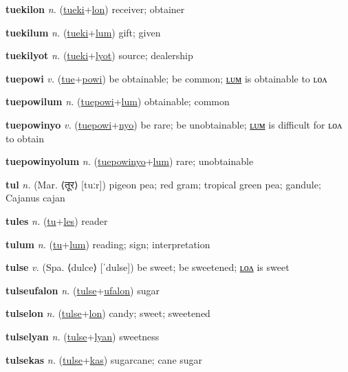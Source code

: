 \textbf{\hypertarget{tuekilon}{tuekilon}} \textit{n.} (\hyperlink{tueki}{tueki}+\allowbreak \hyperlink{lon}{lon})
receiver; obtainer

\textbf{\hypertarget{tuekilum}{tuekilum}} \textit{n.} (\hyperlink{tueki}{tueki}+\allowbreak \hyperlink{lum}{lum})
gift; given

\textbf{\hypertarget{tuekilyot}{tuekilyot}} \textit{n.} (\hyperlink{tueki}{tueki}+\allowbreak \hyperlink{lyot}{lyot})
source; dealership

\textbf{\hypertarget{tuepowi}{tuepowi}} \textit{v.} (\hyperlink{tue}{tue}+\allowbreak \hyperlink{powi}{powi})
be obtainable; be common; \hyperlink{tuepowilum}{ʟᴜᴍ} is obtainable to ʟᴏᴧ

\textbf{\hypertarget{tuepowilum}{tuepowilum}} \textit{n.} (\hyperlink{tuepowi}{tuepowi}+\allowbreak \hyperlink{lum}{lum})
obtainable; common

\textbf{\hypertarget{tuepowinyo}{tuepowinyo}} \textit{v.} (\hyperlink{tuepowi}{tuepowi}+\allowbreak \hyperlink{nyo}{nyo})
be rare; be unobtainable; \hyperlink{tuepowinyolum}{ʟᴜᴍ} is difficult for ʟᴏᴧ to obtain

\textbf{\hypertarget{tuepowinyolum}{tuepowinyolum}} \textit{n.} (\hyperlink{tuepowinyo}{tuepowinyo}+\allowbreak \hyperlink{lum}{lum})
rare; unobtainable

\textbf{\hypertarget{tul}{tul}} \textit{n.} (Mar. ⟨{\devanagari{}तूर}⟩ [tuːr])
pigeon pea; red gram; tropical green pea; gandule; Cajanus cajan

\textbf{\hypertarget{tules}{tules}} \textit{n.} (\hyperlink{tu}{tu}+\allowbreak \hyperlink{les}{les})
reader

\textbf{\hypertarget{tulum}{tulum}} \textit{n.} (\hyperlink{tu}{tu}+\allowbreak \hyperlink{lum}{lum})
reading; sign; interpretation

\textbf{\hypertarget{tulse}{tulse}} \textit{v.} (Spa. ⟨dulce⟩ [ˈdulse])
be sweet; be sweetened; \hyperlink{tulselon}{ʟᴏᴧ} is sweet

\textbf{\hypertarget{tulseufalon}{tulseufalon}} \textit{n.} (\hyperlink{tulse}{tulse}+\allowbreak \hyperlink{ufalon}{ufalon})
sugar

\textbf{\hypertarget{tulselon}{tulselon}} \textit{n.} (\hyperlink{tulse}{tulse}+\allowbreak \hyperlink{lon}{lon})
candy; sweet; sweetened

\textbf{\hypertarget{tulselyan}{tulselyan}} \textit{n.} (\hyperlink{tulse}{tulse}+\allowbreak \hyperlink{lyan}{lyan})
sweetness

\textbf{\hypertarget{tulsekas}{tulsekas}} \textit{n.} (\hyperlink{tulse}{tulse}+\allowbreak \hyperlink{kas}{kas})
sugarcane; cane sugar

